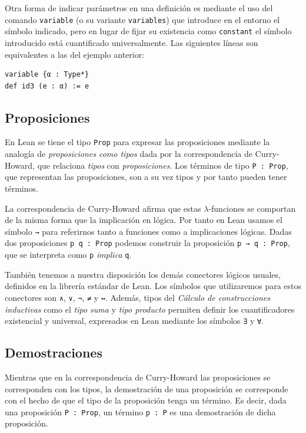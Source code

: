 Otra forma de indicar parámetros en una definición es mediante el uso del
comando \lstinline{variable} (o su variante \lstinline{variables}) que introduce
en el entorno el símbolo indicado, pero en lugar de fijar su existencia como
\lstinline{constant} el símbolo introducido está \guillemotleft cuantificado
universalmente\guillemotright. Las siguientes líneas son equivalentes a las del
ejemplo anterior:

\begin{lstlisting}
variable {α : Type*}
def id3 (e : α) := e
\end{lstlisting}

\subsection{Proposiciones}

En Lean se tiene el tipo \lstinline{Prop} para expresar las
proposiciones mediante la analogía de \textit{proposiciones como tipos} dada por
la correspondencia de Curry-Howard, que relaciona \textit{tipos} con
\textit{proposiciones}. Los términos de tipo \lstinline{P : Prop}, que representan las
proposiciones, son a su vez tipos y por tanto pueden tener términos.

La correspondencia de Curry-Howard afirma que estas $\lambda$-funciones
se comportan de la misma forma que la implicación en lógica.
Por tanto en Lean usamos el símbolo \lstinline{→} para referirnos tanto a
funciones como a implicaciones lógicas. Dadas dos
proposiciones \lstinline{p q : Prop} podemos construir la proposición
\lstinline{p → q : Prop}, que se interpreta como \lstinline{p} \textit{implica}
\lstinline{q}.


También tenemos a nuestra disposición los demás conectores lógicos usuales,
definidos en la librería estándar de Lean. Los símbolos que
utilizaremos para estos conectores son \lstinline{∧}, \lstinline{∨},
\lstinline{¬}, \lstinline{≠} y \lstinline{↔}. Además, tipos del \textit{Cálculo
de construcciones inductivas} como el \textit{tipo suma} y \textit{tipo
	producto} permiten definir los cuantificadores existencial y universal,
expresados en Lean mediante los símbolos \lstinline{∃} y \lstinline{∀}.

\subsection{Demostraciones}

Mientras que en la correspondencia de Curry-Howard las proposiciones se
corresponden con los tipos, la demostración de una proposición se corresponde
con el hecho de que el tipo de la proposición tenga un término. Es decir, dada
una proposición \lstinline{P : Prop}, un término \lstinline{p : P} es una
demostración de dicha proposición.

